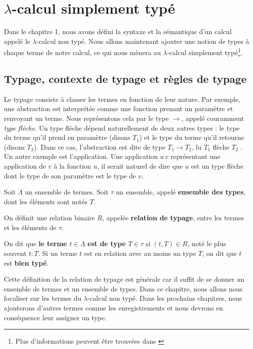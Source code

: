 \chapter{$\lambda$-calcul simplement typé}

Dans le chapitre 1, nous avons défini la syntaxe et la sémantique d'un calcul
appelé le $\lambda$-calcul non typé. Nous allons maintenant ajouter une notion de types à
chaque terme de notre calcul, ce qui nous mènera au $\lambda$-calcul simplement
typé\footnote{Plus d'informations peuvent être trouvées dans \cite{tapl-simply-typed-lambda-calculus}}.

\section{Typage, contexte de typage et règles de typage}

Le typage consiste à classer les termes en fonction de leur nature. Par exemple,
une abstraction est interprétée comme une fonction prenant un paramètre et
renvoyant un terme. Nous représentons cela par le type $\rightarrow$, appelé
couramment \textit{type flèche}. Un type flèche dépend naturellement de deux autres types : le
type du terme qu'il prend en paramètre (disons $T_{1}$) et le type du terme
qu'il retourne (disons $T_{2}$). Dans ce cas, l'abstraction est dite de type
$T_{1} \rightarrow T_{2}$, lu \og $T_{1}$ flèche $T_{2}$ \fg. Un
autre exemple est l'application. Une application $u \, v$ représentant une
application de $v$ à la fonction $u$, il serait naturel de dire que $u$ est un
type flèche dont le type de son paramètre est le type de $v$.

\begin{definition} 
  \label{def:simply-typed-lambda-calculus-type-relation}
  Soit $\Lambda$ un ensemble de termes.
  Soit $\tau$ un ensemble, appelé \textbf{ensemble des types}, dont les éléments
  sont notés $T$.

  On définit une relation binaire $R$, appelée \textbf{relation de typage}, entre les
  termes et les éléments de $\tau$.
  
  On dit que \textbf{le terme $t \in \Lambda$ est de type $T \in \tau$} si $(t, T)
  \in R$, noté le plus souvent $t : T$. Si un terme $t$ est en relation avec au
  moins un type $T$, on dit que $t$ est \textbf{bien typé}.
\end{definition}

Cette définition de la relation de typage est générale car il suffit de se
donner un ensemble de termes et un ensemble de types. Dans ce chapitre, nous
allons nous focaliser sur les termes du $\lambda$-calcul non typé. Dans les
prochains chapitres, nous ajouterons d'autres termes comme les enregistrements
et nous devrons en conséquence leur assigner un type.

